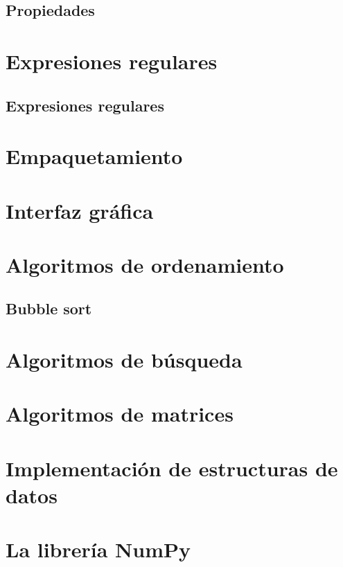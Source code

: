 \documentclass{report}
\begin{document}
\section{Propiedades}

\clearpage\chapter{Expresiones regulares}

\section{Expresiones regulares}

\clearpage\chapter{Empaquetamiento}

\clearpage\chapter{Interfaz gráfica}

\clearpage\chapter{Algoritmos de ordenamiento}

\section{Bubble sort}



\clearpage\chapter{Algoritmos de búsqueda}

\clearpage\chapter{Algoritmos de matrices}

\clearpage\chapter{Implementación de estructuras de datos}

\clearpage\chapter{La librería NumPy}
\end{document}
